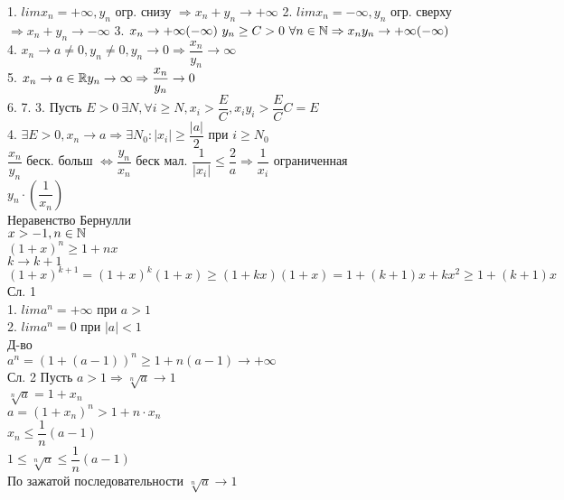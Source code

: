 1. $lim x_n = +\infty, y_n $ огр. снизу $ \Rightarrow x_n + y_n \rightarrow +\infty $
2. $lim x_n = -\infty, y_n $ огр. сверху $ \Rightarrow x_n + y_n \rightarrow -\infty $
3. $ x_n \rightarrow +\infty (-\infty) \ y_n \geq C > 0 \ \forall n \in  \mathbb{N} \Rightarrow x_n y_n \rightarrow +\infty ( -\infty) $ \\
4. $ x_n \rightarrow a \neq 0, y_n \neq 0, y_n \rightarrow 0 \Rightarrow \dfrac{x_n}{y_n} \rightarrow \infty$ \\
5. $ x_n \rightarrow a \in \mathbb{R} y_n \rightarrow \infty \Rightarrow \dfrac{x_n}{y_n} \rightarrow 0 $ \\
6. 
7. %
3. Пусть $ E > 0 \  \exists N, \forall i \geq N, x_i > \dfrac{E}{C}, x_i y_i > \dfrac{E}{C} C = E $ \\
4. $ \exists E > 0, x_n \rightarrow a \Rightarrow \exists N_0 : |x_i| \geq \dfrac{|a|}{2} $ при  $ i \geq N_0$ \\
$ \dfrac{x_n}{y_n} $ беск. больш $ \Leftrightarrow \dfrac{y_n}{x_n} $ беск мал. $ \dfrac{1}{|x_i|} \leq \dfrac{2}{a} \Rightarrow \dfrac{1}{x_i}$ ограниченная \\
$ y_n \cdot \left( \dfrac{1}{x_n} \right)  $\\

Неравенство Бернулли \\
$ x > -1, n \in \mathbb{N} $ \\
$ (1+x)^n \geq 1 + nx $ \\
$ k \rightarrow k + 1 $ \\
$ (1+x)^{k+1} = (1+x)^k(1+x) \geq (1+kx)(1+x) = 1 + (k+1)x + kx^2 \geq 1 + (k+1)x $ \\
Сл. 1 \\
1. $ lim a^n = +\infty $ при $ a > 1 $ \\
2. $ lim a^n = 0$ при $ |a| < 1$ \\
Д-во \\
$ a^n = (1 + (a-1))^n \geq 1 + n(a-1) \rightarrow +\infty $\\
Сл. 2 Пусть $ a > 1 \Rightarrow \sqrt[n]{a} \rightarrow 1$\\
$ \sqrt[n]{a} = 1 + x_n $ \\
$ a = (1 + x_n) ^n > 1 + n \cdot x_n $ \\
$ x_n \leq \dfrac{1}{n} (a-1)  $ \\
$ 1 \leq \sqrt[n]{a} \leq  \dfrac{1}{n} (a-1) $ \\
По зажатой последовательности $ \sqrt[n]{a} \rightarrow 1 $\\


